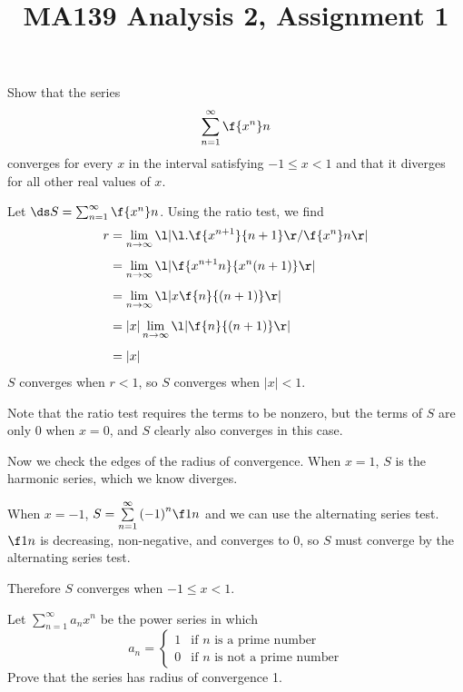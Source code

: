 \documentclass[a4paper]{article}
\title{MA139 Analysis 2, Assignment 1}
\begin{document}
\maketitle

\setlength{\parindent}{0em}
\setlength{\parskip}{1em}


\begin{questionbody}
Show that the series\[
\sum_{n=1}^\infty \f{x^n}n
\] converges for every $x$ in the interval satisfying $-1 \le x < 1$ and that it diverges for all other real values of $x$.
\end{questionbody}

Let $\ds S = \sum_{n=1}^\infty \f{x^n}n$. Using the ratio test, we find \begin{align*}
r &= \lim_{n \to \infty} \l| \l. \f{x^{n+1}}{n+1} \r/ \f{x^n}n \r|\\[1ex]
&= \lim_{n \to \infty} \l| \f{x^{n+1} n}{x^n (n+1)} \r|\\[1ex]
&= \lim_{n \to \infty} \l| x \f{n}{(n+1)} \r|\\[1ex]
&= |x| \lim_{n \to \infty} \l| \f{n}{(n+1)} \r|\\[1ex]
&= |x|
\end{align*}
$S$ converges when $r < 1$, so $S$ converges when $|x| < 1$.

Note that the ratio test requires the terms to be nonzero, but the terms of $S$ are only $0$ when $x=0$, and $S$ clearly also converges in this case.

Now we check the edges of the radius of convergence. When $x=1$, $S$ is the harmonic series, which we know diverges. %

When $x=-1$, $S = \sum\limits_{n=1}^\infty {(-1)}^n \f1n$ and we can use the alternating series test. $\f1n$ is decreasing, non-negative, and converges to $0$, so $S$ must converge by the alternating series test.

Therefore $S$ converges when $-1 \le x < 1$.


\begin{questionbody}
Let $\sum_{n=1}^\infty a_n x^n$ be the power series in which \[
a_n = \begin{cases}
1 & \text{if $n$ is a prime number} \\
0 & \text{if $n$ is not a prime number}
\end{cases} \] Prove that the series has radius of convergence 1.
\end{questionbody}
\end{document}
